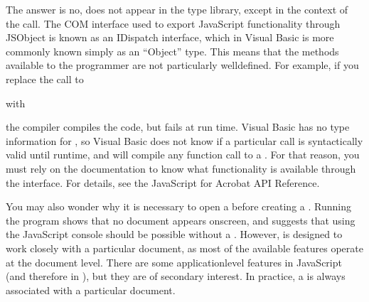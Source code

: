 \documentclass[letterpaper,12pt,english,openany,oneside]{sphinxmanual}
\begin{document}
The answer is no,  does not appear in the type library, except in the context of the  call. The COM interface used to export JavaScript functionality through JSObject is known as an IDispatch interface, which in Visual Basic is more commonly known simply as an “Object” type. This means that the methods available to the programmer are not particularly well\sphinxhyphen{}defined. For example, if you replace the call to

\begin{sphinxVerbatim}[commandchars=\\\{\}]
\end{sphinxVerbatim}

with

\begin{sphinxVerbatim}[commandchars=\\\{\}]
\end{sphinxVerbatim}

the compiler compiles the code, but fails at run time. Visual Basic has no type information for , so Visual Basic does not know if a particular call is syntactically valid until run\sphinxhyphen{}time, and will compile any function call to a . For that reason, you must rely on the documentation to know what functionality is available through the  interface. For details, see the JavaScript for Acrobat API Reference.

You may also wonder why it is necessary to open a  before creating a . Running the program shows that no document appears onscreen, and suggests that using the JavaScript console should be possible without a . However,  is designed to work closely with a particular document, as most of the available features operate at the document level. There are some application\sphinxhyphen{}level features in JavaScript (and therefore in ), but they are of secondary interest. In practice, a  is always associated with a particular document.
\end{document}
